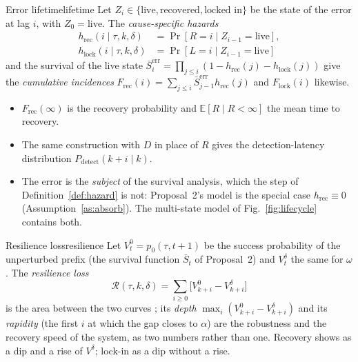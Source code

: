 \documentclass[10pt,a4paper]{article}
\begin{document}
\begin{definition}{Error lifetime}{lifetime}
Let $Z_i\in\{\text{live},\text{recovered},\text{locked in}\}$ be the state of the error at lag $i$, with $Z_0=\text{live}$. The \emph{cause-specific hazards}
\begin{align*}
h_{\mathrm{rec}}(i\mid\tau,k,\delta)&=\Pr[R{=}i\mid Z_{i-1}{=}\text{live}],\\
h_{\mathrm{lock}}(i\mid\tau,k,\delta)&=\Pr[L{=}i\mid Z_{i-1}{=}\text{live}]
\end{align*}
and the survival of the live state $\bar S^{\mathrm{err}}_i=\prod_{j\le i}(1-h_{\mathrm{rec}}(j)-h_{\mathrm{lock}}(j))$ give the \emph{cumulative incidences} $F_{\mathrm{rec}}(i)=\sum_{j\le i}\bar S^{\mathrm{err}}_{j-1}h_{\mathrm{rec}}(j)$ and $F_{\mathrm{lock}}(i)$ likewise.
\begin{itemize}[leftmargin=1.1em]
\item $F_{\mathrm{rec}}(\infty)$ is the recovery probability and $\mathbb{E}[R\mid R<\infty]$ the mean time to recovery.
\item The same construction with $D$ in place of $R$ gives the detection-latency distribution $P_{\mathrm{detect}}(k{+}i\mid k)$.
\item The error is the \emph{subject} of the survival analysis, which the step of Definition~\ref{def:hazard} is not: Proposal~2's model is the special case $h_{\mathrm{rec}}\equiv0$ (Assumption~\ref{as:absorb}). The multi-state model of Fig.~\ref{fig:lifecycle} contains both.
\end{itemize}
\end{definition}

\begin{definition}{Resilience loss}{resilience}
Let $V^0_t=p_0(\tau,t{+}1)$ be the success probability of the unperturbed prefix (the survival function $\bar S_t$ of Proposal~2) and $V^\delta_t$ the same for $\omega$. The \emph{resilience loss}
\[\mathcal{R}(\tau,k,\delta)=\sum_{i\ge0}\big[V^0_{k+i}-V^\delta_{k+i}\big]\]
is the area between the two curves \cite{bruneau2003resilience}; its \emph{depth} $\max_i(V^0_{k+i}-V^\delta_{k+i})$ and its \emph{rapidity} (the first $i$ at which the gap closes to $\alpha$) are the robustness and the recovery speed of the system, as two numbers rather than one. Recovery shows as a dip and a rise of $V^\delta$; lock-in as a dip without a rise.
\end{definition}
\end{document}
